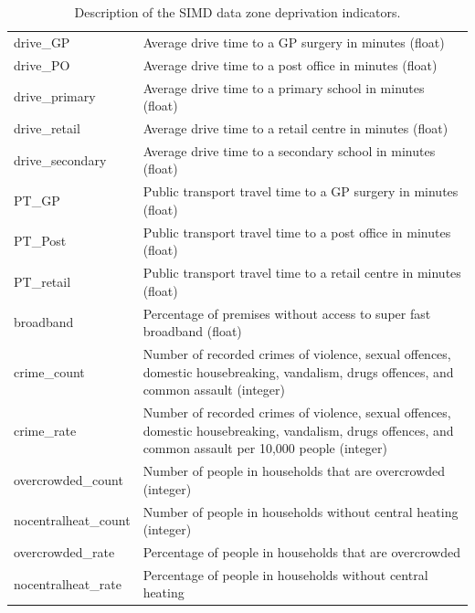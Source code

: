 \documentclass{thesis}
\begin{document}
\begin{table}[ht!]
\begin{tabular}{||l p{100mm}||}
     drive\_GP & Average drive time to a GP surgery in minutes (float) \\
     drive\_PO & Average drive time to a post office in minutes (float) \\
     drive\_primary & Average drive time to a primary school in minutes (float) \\
     drive\_retail & Average drive time to a retail centre in minutes (float) \\
     drive\_secondary & Average drive time to a secondary school in minutes (float) \\
     PT\_GP & Public transport travel time to a GP surgery in minutes (float) \\
     PT\_Post & Public transport travel time to a post office in minutes (float) \\
     PT\_retail & Public transport travel time to a retail centre in minutes (float) \\
     broadband & Percentage of premises without access to super fast broadband (float) \\
     crime\_count & Number of recorded crimes of violence, sexual offences, domestic housebreaking, vandalism, \newline drugs offences, and common assault (integer) \\
     crime\_rate & Number of recorded crimes of violence, sexual offences, domestic housebreaking, vandalism, \newline drugs offences, and common assault per 10,000 people (integer) \\
     overcrowded\_count & Number of people in households that are overcrowded (integer) \\
     nocentralheat\_count & Number of people in households without central heating (integer) \\
     overcrowded\_rate & Percentage of people in households that are overcrowded \\
     nocentralheat\_rate & Percentage of people in households without central heating \\ [1ex] 
     \hline
    \end{tabular}
    \hspace{100mm}
    \caption{Description of the SIMD data zone deprivation indicators.}
    \label{table:simd-deprivation-indicators}
\end{table}

\end{document}
